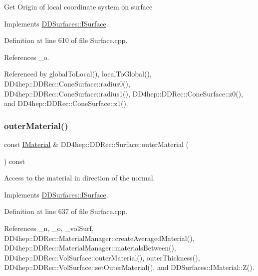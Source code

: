 Get Origin of local coordinate system on surface 

Implements \hyperlink{class_d_d_surfaces_1_1_i_surface_a552cf76ca76154d0a6d9709d826b57f4}{D\+D\+Surfaces\+::\+I\+Surface}.



Definition at line 610 of file Surface.\+cpp.



References \+\_\+o.



Referenced by global\+To\+Local(), local\+To\+Global(), D\+D4hep\+::\+D\+D\+Rec\+::\+Cone\+Surface\+::radius0(), D\+D4hep\+::\+D\+D\+Rec\+::\+Cone\+Surface\+::radius1(), D\+D4hep\+::\+D\+D\+Rec\+::\+Cone\+Surface\+::z0(), and D\+D4hep\+::\+D\+D\+Rec\+::\+Cone\+Surface\+::z1().

\hypertarget{class_d_d4hep_1_1_d_d_rec_1_1_surface_a510bdf9b19e1b4f8dad0b8770e513826}{}\label{class_d_d4hep_1_1_d_d_rec_1_1_surface_a510bdf9b19e1b4f8dad0b8770e513826} 
\subsubsection{\texorpdfstring{outer\+Material()}{outerMaterial()}}
{\footnotesize\ttfamily const \hyperlink{class_d_d_surfaces_1_1_i_material}{I\+Material} \& D\+D4hep\+::\+D\+D\+Rec\+::\+Surface\+::outer\+Material (\begin{DoxyParamCaption}{ }\end{DoxyParamCaption}) const\hspace{0.3cm}{\ttfamily [virtual]}}



Access to the material in direction of the normal. 



Implements \hyperlink{class_d_d_surfaces_1_1_i_surface_a49dfd8a5eef419226abc675b8d1126a5}{D\+D\+Surfaces\+::\+I\+Surface}.



Definition at line 637 of file Surface.\+cpp.



References \+\_\+n, \+\_\+o, \+\_\+vol\+Surf, D\+D4hep\+::\+D\+D\+Rec\+::\+Material\+Manager\+::create\+Averaged\+Material(), D\+D4hep\+::\+D\+D\+Rec\+::\+Material\+Manager\+::materials\+Between(), D\+D4hep\+::\+D\+D\+Rec\+::\+Vol\+Surface\+::outer\+Material(), outer\+Thickness(), D\+D4hep\+::\+D\+D\+Rec\+::\+Vol\+Surface\+::set\+Outer\+Material(), and D\+D\+Surfaces\+::\+I\+Material\+::\+Z().

